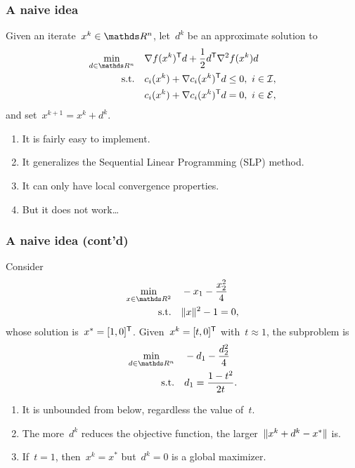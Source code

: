 \documentclass{polyu-presentation}
\newcommand{\con}[1]{c_{#1}}
\newcommand{\ieq}{\mathcal{E}}
\newcommand{\iub}{\mathcal{I}}
\newcommand{\obj}{f}
\begin{document}
\begin{frame}
    \frametitle{A naive idea}

    Given an iterate~$x^k \in \R^n$, let~$d^k$ be an approximate solution to
    \begin{align*}
        \min_{d \in \R^n}   & \quad \nabla \obj(x^k)^{\T} d + \frac{1}{2} d^{\T} \nabla^2 \obj(x^k) d\\
        \text{s.t.}         & \quad \con{i}(x^k) + \nabla \con{i}(x^k)^{\T} d \le 0, ~ i \in \iub,\\
                            & \quad \con{i}(x^k) + \nabla \con{i}(x^k)^{\T} d = 0, ~ i \in \ieq,
    \end{align*}
    and set~$x^{k + 1} = x^k + d^k$.
    
    \medskip

    \begin{block}{}
        \begin{enumerate}[<+(1)->]
            \item It is fairly easy to \alert{implement}.
            \item It generalizes the \alert{Sequential Linear Programming} (SLP) method.
            \item It can only have \alert{local convergence} properties.
            \item But it does \alert{not} work\dots
        \end{enumerate}
    \end{block}
\end{frame}

\begin{frame}
    \frametitle{A naive idea (cont'd)}

    Consider
    \begin{align*}
        \min_{x \in \R^2}   & \quad -x_1 - \frac{x_2^2}{4}\\
        \text{s.t.}         & \quad \norm{x}^2 - 1 = 0,
    \end{align*}
    whose \alert{solution} is~$x^{\ast} = [1, 0]^{\mathsf{T}}$.
    Given~$x^k = [t, 0]^{\mathsf{T}}$ with~$t \approx 1$, the subproblem is
    \begin{align*}
        \min_{d \in \R^n}   & \quad -d_1 - \frac{d_2^2}{4}\\
        \text{s.t.}         & \quad d_1 = \frac{1 - t^2}{2t}.
    \end{align*}

    \begin{block}{}
        \begin{enumerate}[<+(1)->]
            \item It is \alert{unbounded from below}, regardless the value of~$t$.
            \item The more~$d^k$ \alert{reduces} the objective function, the \alert{larger}~$\lVert x^k + d^k - x^{\ast}\rVert$ is.
            \item If~$t = 1$, then~$x^k = x^{\ast}$ but~$d^k = 0$ is a \alert{global maximizer}.
        \end{enumerate}
    \end{block}
\end{frame}
\end{document}
